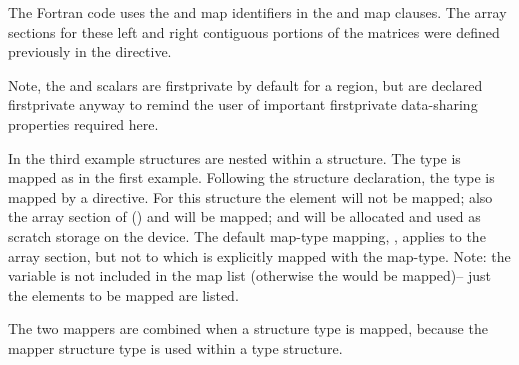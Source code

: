 The Fortran code uses the  and  map identifiers in the
 and  map clauses.  
The array sections for these left and right contiguous portions of the matrices 
were defined previously in the  directive.

Note, the  and  scalars are firstprivate 
by default for a  region, but are declared firstprivate anyway
to remind the user of important firstprivate data-sharing properties required here.



In the third example  structures are
nested within a  structure. The  type is mapped
as in the first example.  Following the  structure declaration, 
the  type is mapped by a  directive. 
For this structure the  element will not be mapped;
also the array section of  () and  will be mapped; and
 will be allocated and used as scratch storage on the device.
The default map-type mapping, , applies to the  array section,
but not to  which is explicitly mapped with the  map-type. 
Note: the variable  is not included in the map list (otherwise
the  would be mapped)-- just the elements 
to be mapped are listed.

The two mappers are combined when a  structure type is mapped,
because the mapper  structure type is used within a 
type structure.



